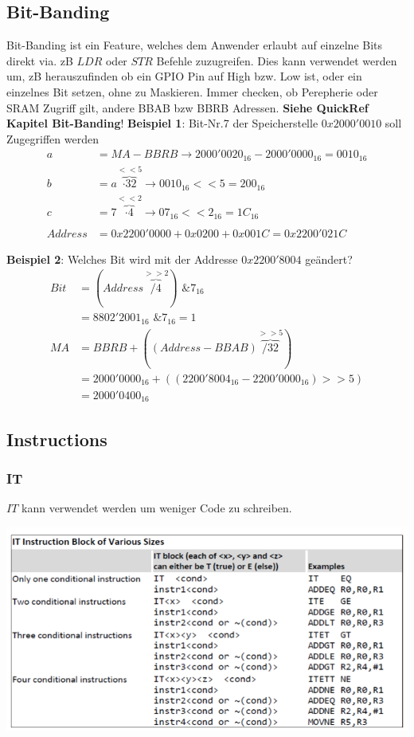 \subsection{Bit-Banding}
Bit-Banding ist ein Feature, welches dem Anwender erlaubt auf einzelne Bits direkt via. zB $LDR$ oder $STR$ Befehle zuzugreifen. Dies kann verwendet werden um, zB herauszufinden ob ein GPIO Pin auf High bzw. Low ist, oder ein einzelnes Bit setzen, ohne zu Maskieren. Immer checken, ob Perepherie oder SRAM Zugriff gilt, andere BBAB bzw BBRB Adressen. \textbf{Siehe QuickRef Kapitel Bit-Banding}!
\noindent\textbf{Beispiel 1}: Bit-Nr.7 der Speicherstelle $0x2000'0010$ soll Zugegriffen werden
\begin{align*}
	a &= MA - BBRB \xrightarrow{} 2000'0020_{16} - 2000'0000_{16} = 0010_{16} \\
	b &= a \overbrace{\cdot 32}^{<< 5} \xrightarrow{} 0010_{16} << 5 = 200_{16}\\
	c &= 7 \overbrace{\cdot 4}^{<< 2} \xrightarrow{} 07_{16} << 2_{16} = 1C_{16} \\
	\\
	Address &= 0x2200'0000 + 0x0200 + 0x001C = 0x2200'021C
\end{align*}

\noindent\textbf{Beispiel 2}: Welches Bit wird mit der Addresse $0x2200'8004$ geändert?
\begin{align*}
	Bit &= (Address \overbrace{/4}^{>> 2}) \text{ \& } 7_{16} \\
	    &= 8802'2001_{16} \text{ \& } 7_{16} = 1 \\
	MA &= BBRB + ((Address - BBAB) \overbrace{/ 32}^{>> 5}) \\
	   &= 2000'0000_{16} + ((2200'8004_{16} - 2200'0000_{16}) >> 5)\\
	   &= 2000'0400_{16}
\end{align*}

\subsection{Instructions}
\subsubsection{IT}
$IT$ kann verwendet werden um weniger Code zu schreiben.
\begin{center}
	\includegraphics[width=0.9\columnwidth]{Images/IT}
\end{center}
